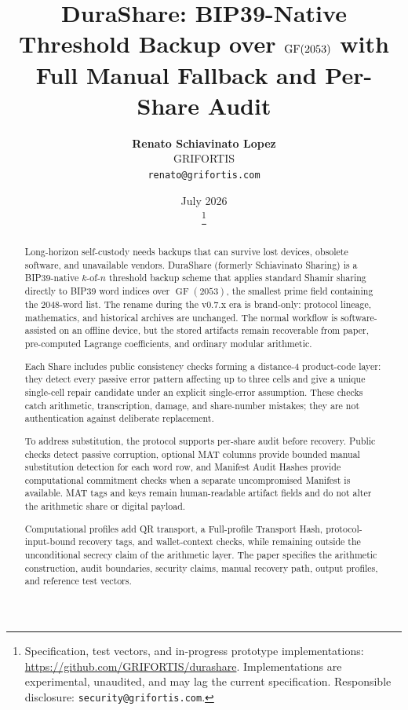 \documentclass[11pt]{article}
\title{\textbf{DuraShare: BIP39-Native Threshold Backup over $\GF(2053)$ with Full Manual Fallback and Per-Share Audit}}
\author{
    \textbf{Renato Schiavinato Lopez} \\
    GRIFORTIS \\
    \texttt{renato@grifortis.com}
}
\date{July 2026\\\DuraShareVersion\thanks{%
    Specification, test vectors, and in-progress prototype implementations:
    \url{https://github.com/GRIFORTIS/durashare}.
    Implementations are experimental, unaudited, and may lag the current specification.
    Responsible disclosure: \texttt{security@grifortis.com}.}}
\newcommand{\GF}{\operatorname{GF}}
\begin{document}
\maketitle

\begin{abstract}
Long-horizon self-custody needs backups that can survive lost devices, obsolete software, and unavailable vendors. DuraShare (formerly Schiavinato Sharing) is a BIP39-native $k$-of-$n$ threshold backup scheme that applies standard Shamir sharing directly to BIP39 word indices over $\GF(2053)$, the smallest prime field containing the 2048-word list. The rename during the v0.7.x era is brand-only: protocol lineage, mathematics, and historical archives are unchanged. The normal workflow is software-assisted on an offline device, but the stored artifacts remain recoverable from paper, pre-computed Lagrange coefficients, and ordinary modular arithmetic.

Each Share includes public consistency checks forming a distance-4 product-code layer: they detect every passive error pattern affecting up to three cells and give a unique single-cell repair candidate under an explicit single-error assumption. These checks catch arithmetic, transcription, damage, and share-number mistakes; they are not authentication against deliberate replacement.

To address substitution, the protocol supports per-share audit before recovery. Public checks detect passive corruption, optional MAT columns provide bounded manual substitution detection for each word row, and Manifest Audit Hashes provide computational commitment checks when a separate uncompromised Manifest is available. MAT tags and keys remain human-readable artifact fields and do not alter the arithmetic share or digital payload.

Computational profiles add QR transport, a Full-profile Transport Hash, protocol-input-bound recovery tags, and wallet-context checks, while remaining outside the unconditional secrecy claim of the arithmetic layer. The paper specifies the arithmetic construction, audit boundaries, security claims, manual recovery path, output profiles, and reference test vectors.
\end{abstract}

\end{document}

